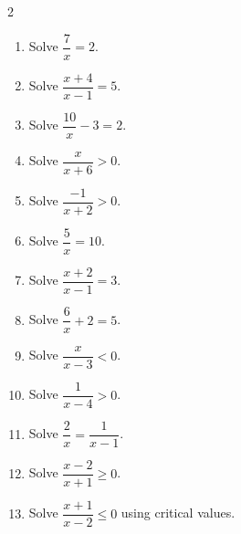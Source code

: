 \documentclass[11pt]{article}
\begin{document}
\clearpage
{}

\begin{recapbox}
\begin{multicols}{2}
\small
\begin{enumerate}[leftmargin=*,itemsep=3pt]
  \item Solve $\dfrac7x=2$.
  \item Solve $\dfrac{x+4}{x-1}=5$.
  \item Solve $\dfrac{10}x-3=2$.
  \item Solve $\dfrac{x}{x+6}>0$.
  \item Solve $\dfrac{-1}{x+2}>0$.
  \item Solve $\dfrac5x=10$.
  \item Solve $\dfrac{x+2}{x-1}=3$.
  \item Solve $\dfrac6x+2=5$.
  \item Solve $\dfrac{x}{x-3}<0$.
  \item Solve $\dfrac{1}{x-4}>0$.
  \item Solve $\dfrac{2}{x}=\dfrac{1}{x-1}$.
  \item Solve $\dfrac{x-2}{x+1}\ge0$.
  \item Solve $\dfrac{x+1}{x-2}\le0$ using critical values.
\end{enumerate}
\end{multicols}
\end{recapbox}
\end{document}
